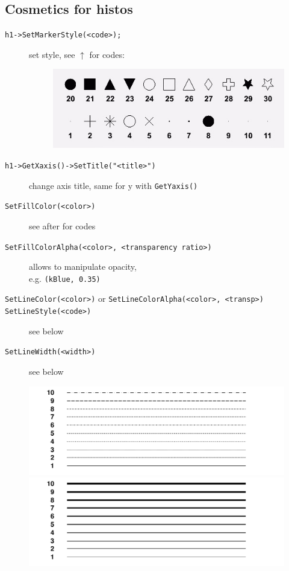 \documentclass[10pt, oneside]{article}
\begin{document}
\subsection{Cosmetics for histos}
\begin{description}
\item[\texttt{h1->SetMarkerStyle(<code>);}] set style, see $\uparrow$ for codes:
\begin{figure}[h!]
\centering
\includegraphics[scale=0.6]{shape.jpg}
\end{figure}
\item[\texttt{h1->GetXaxis()->SetTitle("<title>")}] change axis title, same for y with \texttt{GetYaxis()}
\item[\texttt{SetFillColor(<color>)}] see after for codes
\item[\texttt{SetFillColorAlpha(<color>, <transparency ratio>)}] allows to manipulate opacity, \\e.g. \texttt{(kBlue, 0.35)}
\item[\texttt{SetLineColor(<color>)} or  \texttt{SetLineColorAlpha(<color>, <transp>)}]
\item[\texttt{SetLineStyle(<code>)}] see below
\item[\texttt{SetLineWidth(<width>)}] see below
\end{description}
\begin{figure}[h!]
\centering
\includegraphics[scale=0.22]{linestyle.png}
\includegraphics[scale=0.2]{linewidth.png}
\end{figure}
\end{document}
